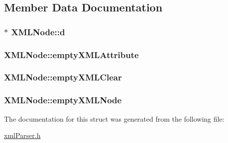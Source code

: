 \subsection{Member Data Documentation}
\hypertarget{structXMLNode_adf30070dcb8b64a31a64e29fc44b682d}{
\subsubsection[{d}]{$\ast$ X\-M\-L\-Node\-::d\hspace{0.3cm}{\ttfamily [private]}}}\label{structXMLNode_adf30070dcb8b64a31a64e29fc44b682d}
\hypertarget{structXMLNode_afc0ee94f7b16fa825e9d06197292244d}{
\subsubsection[{empty\-X\-M\-L\-Attribute}]{ X\-M\-L\-Node\-::empty\-X\-M\-L\-Attribute\hspace{0.3cm}{\ttfamily [static]}}}\label{structXMLNode_afc0ee94f7b16fa825e9d06197292244d}
\hypertarget{structXMLNode_ad32786123d26b281bfafd9325b22f47e}{
\subsubsection[{empty\-X\-M\-L\-Clear}]{ X\-M\-L\-Node\-::empty\-X\-M\-L\-Clear\hspace{0.3cm}{\ttfamily [static]}}}\label{structXMLNode_ad32786123d26b281bfafd9325b22f47e}
\hypertarget{structXMLNode_a90565bdb240d2f14f6a3d43f15100b63}{
\subsubsection[{empty\-X\-M\-L\-Node}]{ X\-M\-L\-Node\-::empty\-X\-M\-L\-Node\hspace{0.3cm}{\ttfamily [static]}}}\label{structXMLNode_a90565bdb240d2f14f6a3d43f15100b63}


The documentation for this struct was generated from the following file\-:\begin{DoxyCompactItemize}
\item 
\hyperlink{xmlParser_8h}{xml\-Parser.\-h}\end{DoxyCompactItemize}
